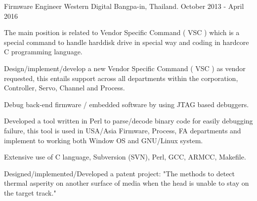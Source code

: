 \begin{cventries}
  \cventry
    {Firmware Engineer} %
    {Western Digital} %
    {Bangpa-in, Thailand.} %
    {October 2013 - April 2016} %
    {
      \begin{cvitems} %
         \item {The main position is related to Vendor Specific Command ( VSC ) which is a special command to handle
    harddisk drive in special way and coding in hardcore C programming
          language.}
         \item {Design/implement/develop a new Vendor Specific Command ( VSC ) as vendor
         requested, this entails support across all departments within the corporation,
         Controller, Servo, Channel and Process.}
         \item {Debug back-end firmware / embedded software by using JTAG based
           debuggers.}
         \item {Developed a tool written in Perl to parse/decode binary code for easily debugging failure,
         this tool is used in USA/Asia Firmware, Process, FA departments and implement to
         working both Window OS and GNU/Linux system.}
         \item {Extensive use of C language, Subversion (SVN), Perl, GCC, ARMCC,
           Makefile.}
         \item {Designed/implemented/Developed a patent project: "The methods to detect thermal asperity on another
          surface of media when the head is unable to stay on the target
          track."}
      \end{cvitems}
    }

\end{cventries}
